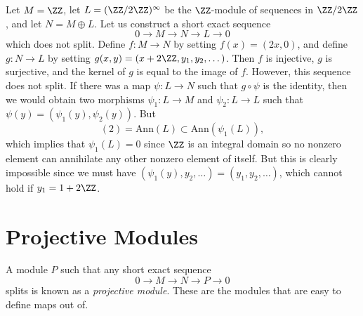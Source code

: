 \begin{example}
    Let $M = \ZZ$, let $L = (\ZZ/2 \ZZ)^\infty$ be the $\ZZ$-module of sequences in $\ZZ/2 \ZZ$, and let $N = M \oplus L$. Let us construct a short exact sequence
    \[ 0 \to M \to N \to L \to 0 \]
    which does not split. Define $f: M \to N$ by setting $f(x) = (2x,0)$, and define $g: N \to L$ by setting $g(x,y) = (x + 2 \ZZ,y_1,y_2,\dots)$. Then $f$ is injective, $g$ is surjective, and the kernel of $g$ is equal to the image of $f$. However, this sequence does not split. If there was a map $\psi: L \to N$ such that $g \circ \psi$ is the identity, then we would obtain two morphisms $\psi_1: L \to M$ and $\psi_2: L \to L$ such that $\psi(y) = (\psi_1(y), \psi_2(y))$. But
    \[ (2) = \text{Ann}(L) \subset \text{Ann}(\psi_1(L)), \]
    which implies that $\psi_1(L) = 0$ since $\ZZ$ is an integral domain so no nonzero element can annihilate any other nonzero element of itself. But this is clearly impossible since we must have $(\psi_1(y), y_2, \dots) = (y_1,y_2,\dots)$, which cannot hold if $y_1 = 1 + 2 \ZZ$.
\end{example}

\section{Projective Modules}

A module $P$ such that any short exact sequence
%
\[ 0 \to M \to N \to P \to 0 \]
%
splits is known as a \emph{projective module}. These are the modules that are easy to define maps out of.

